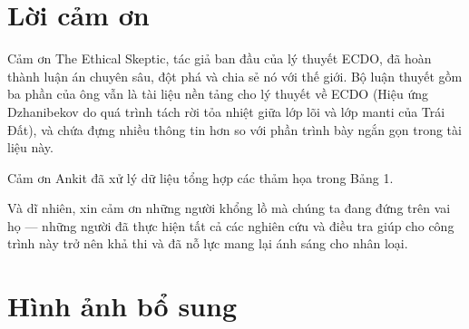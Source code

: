\documentclass[10pt,twocolumn,letterpaper]{article}
\begin{document}
\section{Lời cảm ơn}

Cảm ơn The Ethical Skeptic, tác giả ban đầu của lý thuyết ECDO, đã hoàn thành luận án chuyên sâu, đột phá và chia sẻ nó với thế giới. Bộ luận thuyết gồm ba phần của ông \cite{1} vẫn là tài liệu nền tảng cho lý thuyết về ECDO (Hiệu ứng Dzhanibekov do quá trình tách rời tỏa nhiệt giữa lớp lõi và lớp manti của Trái Đất), và chứa đựng nhiều thông tin hơn so với phần trình bày ngắn gọn trong tài liệu này.

Cảm ơn Ankit đã xử lý dữ liệu tổng hợp các thảm họa trong Bảng 1.

Và dĩ nhiên, xin cảm ơn những người khổng lồ mà chúng ta đang đứng trên vai họ — những người đã thực hiện tất cả các nghiên cứu và điều tra giúp cho công trình này trở nên khả thi và đã nỗ lực mang lại ánh sáng cho nhân loại.

\clearpage
\twocolumn

\section{Hình ảnh bổ sung}
\end{document}
